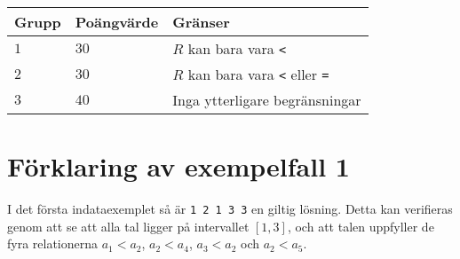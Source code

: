 \noindent
\begin{tabular}{| l | l | l |}
  \hline
  Grupp & Poängvärde & Gränser \\ \hline
  $1$   & $30$       & $R$ kan bara vara \texttt{<} \\ \hline
  $2$   & $30$       & $R$ kan bara vara \texttt{<} eller \texttt{=} \\ \hline
  $3$   & $40$       & Inga ytterligare begränsningar \\ \hline
\end{tabular}

\section*{Förklaring av exempelfall 1}
I det första indataexemplet så är \texttt{1 2 1 3 3} en giltig lösning. Detta kan verifieras
genom att se att alla tal ligger på intervallet $[1, 3]$, och att talen uppfyller de fyra relationerna $a_1 < a_2$,
$a_2 < a_4$, $a_3 < a_2$ och $a_2 < a_5$.